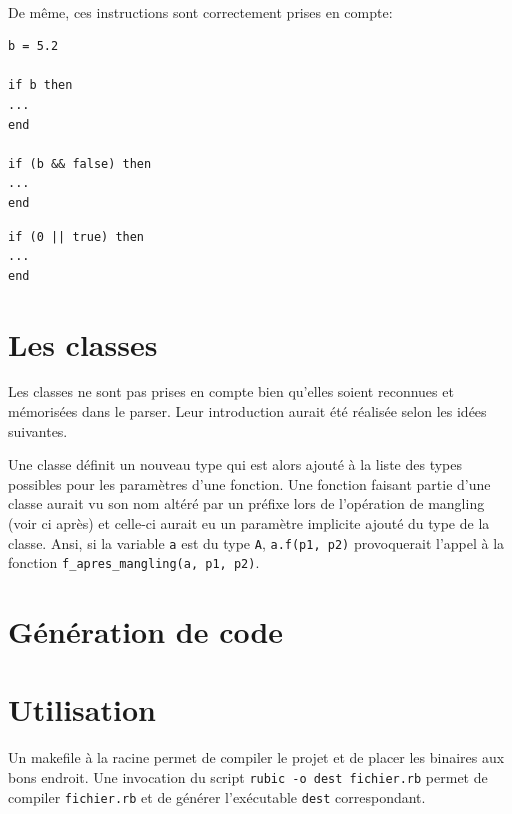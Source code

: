 \documentclass[12pt]{article}
\begin{document}
\paragraph{} De même, ces instructions sont correctement prises en compte:

\vspace{0.5cm}

\begin{minipage}{0.48\textwidth}
\begin{verbatim}
b = 5.2

if b then
...
end

if (b && false) then
...
end
\end{verbatim}
\end{minipage}
\begin{minipage}{0.48\textwidth}
\begin{verbatim}
if (0 || true) then
...
end
\end{verbatim}
\end{minipage}

\vspace{0.5cm}


\section{Les classes}

Les classes ne sont pas prises en compte bien qu'elles soient reconnues et mémorisées dans le parser. Leur introduction aurait été réalisée selon les idées suivantes.

Une classe définit un nouveau type qui est alors ajouté à la liste des types possibles pour les paramètres d'une fonction. Une fonction faisant partie d'une classe aurait vu son nom altéré par un préfixe lors de l'opération de mangling (voir ci après) et celle-ci aurait eu un paramètre implicite ajouté du type de la classe. Ansi, si la variable \verb!a! est du type \verb!A!, \verb!a.f(p1, p2)! provoquerait l'appel à la fonction \verb!f_apres_mangling(a, p1, p2)!.

\section{Génération de code}

\section{Utilisation}

Un makefile à la racine permet de compiler le projet et de placer les binaires aux bons endroit. Une invocation du script \verb!rubic -o dest fichier.rb! permet de compiler \verb!fichier.rb! et de générer l'exécutable \verb!dest! correspondant.
\end{document}
